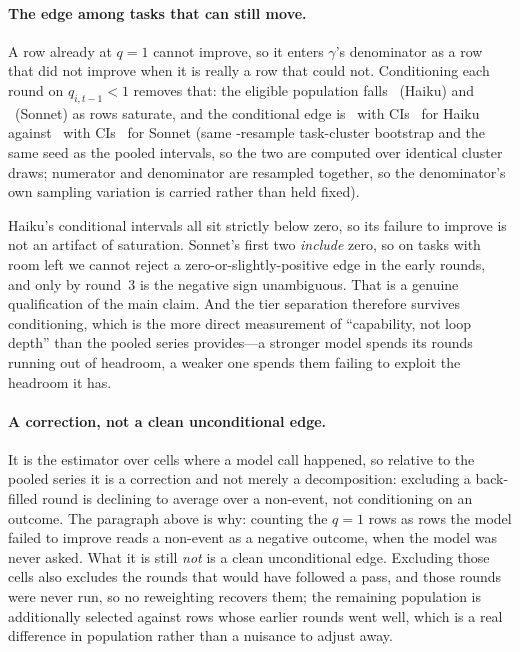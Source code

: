 \paragraph{The edge among tasks that can still move.} A row already at $q{=}1$ cannot improve, so it enters $\gamma$'s denominator as a row that did not improve when it is really a row that could not. Conditioning each round on $q_{i,t-1}<1$ removes that: the eligible population falls \statPBHaikuHeadroomN\ (Haiku) and \statPBSonnetHeadroomN\ (Sonnet) as rows saturate, and the conditional edge is \statPBHaikuEdgeHeadroom\ with CIs \statPBHaikuEdgeHeadroomCI\ for Haiku against \statPBSonnetEdgeHeadroom\ with CIs \statPBSonnetEdgeHeadroomCI\ for Sonnet (same \statPBEdgeCIReps-resample task-cluster bootstrap and the same seed as the pooled intervals, so the two are computed over identical cluster draws; numerator and denominator are resampled together, so the denominator's own sampling variation is carried rather than held fixed).

Haiku's conditional intervals all sit strictly below zero, so its failure to improve is not an artifact of saturation. Sonnet's first two \emph{include} zero, so on tasks with room left we cannot reject a zero-or-slightly-positive edge in the early rounds, and only by round~3 is the negative sign unambiguous. That is a genuine qualification of the main claim. And the tier separation therefore survives conditioning, which is the more direct measurement of ``capability, not loop depth'' than the pooled series provides---a stronger model spends its rounds running out of headroom, a weaker one spends them failing to exploit the headroom it has.

\paragraph{A correction, not a clean unconditional edge.} It is the estimator over cells where a model call happened, so relative to the pooled series it is a correction and not merely a decomposition: excluding a back-filled round is declining to average over a non-event, not conditioning on an outcome. The paragraph above is why: counting the $q{=}1$ rows as rows the model failed to improve reads a non-event as a negative outcome, when the model was never asked. What it is still \emph{not} is a clean unconditional edge. Excluding those cells also excludes the rounds that would have followed a pass, and those rounds were never run, so no reweighting recovers them; the remaining population is additionally selected against rows whose earlier rounds went well, which is a real difference in population rather than a nuisance to adjust away.

